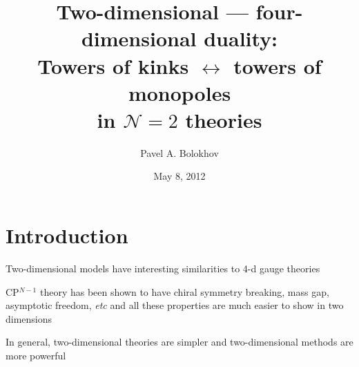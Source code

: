 \documentclass{beamer}
\title[Two-dim. --- four-dim. duality]
      {Two-dimensional --- four-dimensional duality:\\
	Towers of kinks $\leftrightarrow$ towers of monopoles\\ 
		in $\mathcal{N}=2$ theories}
\author{Pavel A. Bolokhov}
\date{May 8, 2012}
\institute[UMN \& SPbSU]{University of Minnesota ~~$\cdot$~~ St.Petersburg State University}
\begin{document}
\maketitle

\section{Introduction}


\begin{frame}{}


	Two-dimensional models have interesting similarities to 4-d gauge theories
\vspace{0.4cm}

	CP$^{N-1}$ theory has been shown to have chiral symmetry breaking, mass gap,
	asymptotic freedom, {\it etc} and all these properties are much easier to show
	in two dimensions 
\vspace{0.4cm}

	In general, two-dimensional theories are simpler and two-dimensional methods
	are more powerful

\end{frame}
\end{document}
